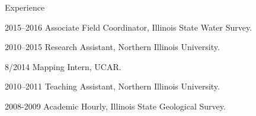 \begin{cvlist}{Experience}

\item[2015--2016] Associate Field Coordinator, Illinois State Water Survey.

\item[2010--2015] Research Assistant, Northern Illinois University.

\item[8/2014] Mapping Intern, UCAR.

\item[2010--2011] Teaching Assistant, Northern Illinois University.

\item[2008-2009] Academic Hourly, Illinois State Geological Survey.

\end{cvlist}

